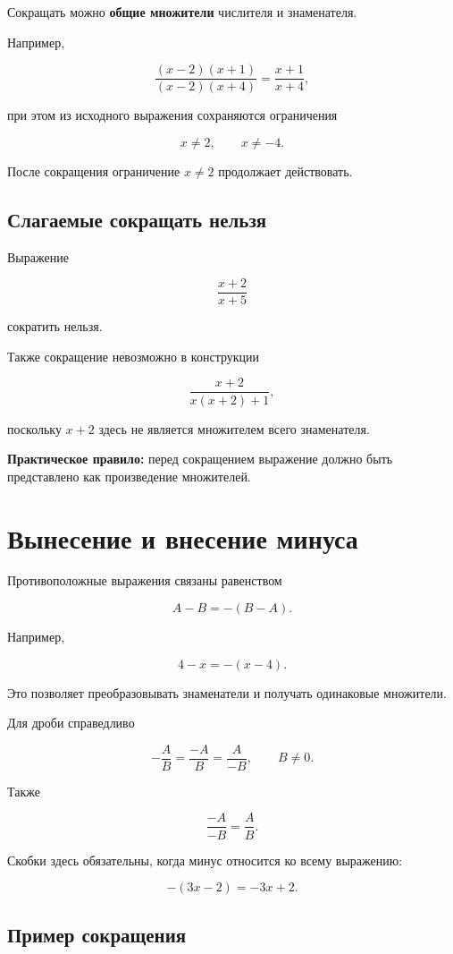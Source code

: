 \documentclass[a4paper,12pt]{article}
\newcommand{\term}[1]{\textbf{\color{darkaccent}#1}}
\newcommand{\important}[1]{\textbf{\color{accent}#1}}
\begin{document}
Сокращать можно \important{общие множители} числителя и знаменателя.

Например,

\[
\frac{(x-2)(x+1)}
     {(x-2)(x+4)}
=
\frac{x+1}{x+4},
\]

при этом из исходного выражения сохраняются ограничения

\[
x\ne2,\qquad x\ne-4.
\]

После сокращения ограничение \(x\ne2\) продолжает действовать.

\subsection{Слагаемые сокращать нельзя}

Выражение

\[
\frac{x+2}{x+5}
\]

сократить нельзя.

Также сокращение невозможно в конструкции

\[
\frac{x+2}{x(x+2)+1},
\]

поскольку \(x+2\) здесь не является множителем всего знаменателя.

\term{Практическое правило:}
перед сокращением выражение должно быть представлено как произведение
множителей.


\section{Вынесение и внесение минуса}

Противоположные выражения связаны равенством

\[
A-B=-(B-A).
\]

Например,

\[
4-x=-(x-4).
\]

Это позволяет преобразовывать знаменатели и получать одинаковые множители.

Для дроби справедливо

\[
-\frac{A}{B}
=
\frac{-A}{B}
=
\frac{A}{-B},
\qquad B\ne0.
\]

Также

\[
\frac{-A}{-B}=\frac{A}{B}.
\]

Скобки здесь обязательны, когда минус относится ко всему выражению:

\[
-(3x-2)=-3x+2.
\]

\subsection{Пример сокращения}
\end{document}
